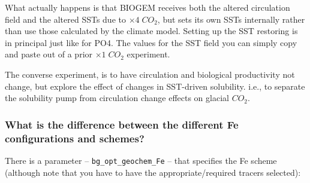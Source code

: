 \documentclass[11pt,fleqn]{book} %
\begin{document}
What actually happens is that BIOGEM receives both the altered circulation field and the altered SSTs due to \(\times  4\;CO_{2}\), but sets its own SSTs internally rather than use those calculated by the climate model. Setting up the SST restoring is in principal just like for PO4. The values for the SST field you can simply copy and paste out of a prior \(\times  1\;CO_{2}\) experiment.

The converse experiment, is to have circulation and biological productivity not change, but explore the effect of changes in SST-driven solubility. i.e., to separate the solubility pump from circulation change effects on glacial \(CO_{2}\).

%
\subsubsection{What is the difference between the different Fe configurations and schemes?}

There is a parameter -- \texttt{bg\_opt\_geochem\_Fe} -- that specifies the Fe scheme (although note that you have to have the appropriate/required tracers selected):
\end{document}
